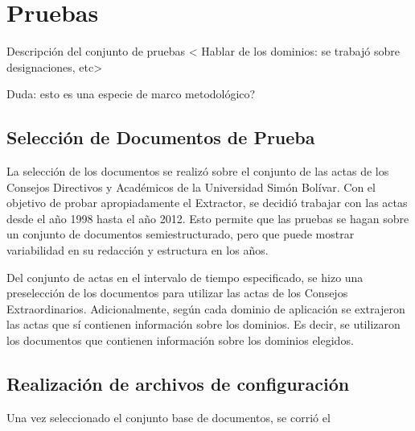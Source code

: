\chapter{Pruebas} \label{chap:pruebas}

Descripción del conjunto de pruebas < Hablar de los dominios: se trabajó sobre designaciones, etc>

Duda: esto es una especie de marco metodológico?

\section{Selección de Documentos de Prueba}

La selección de los documentos se realizó sobre el conjunto de las actas de los Consejos Directivos y Académicos de la Universidad Simón Bolívar. Con el objetivo de probar apropiadamente el Extractor, se decidió trabajar con las actas desde el año 1998 hasta el año 2012. Esto permite que las pruebas se hagan sobre un conjunto de documentos semiestructurado, pero que puede mostrar variabilidad en su redacción y estructura en los años.

Del conjunto de actas en el intervalo de tiempo especificado, se hizo una preselección de los documentos para utilizar las actas de los Consejos Extraordinarios. Adicionalmente, según cada dominio de aplicación se extrajeron las actas que sí contienen información sobre los dominios. Es decir, se utilizaron los documentos que contienen información sobre los dominios elegidos.

\section{Realización de archivos de configuración}

Una vez seleccionado el conjunto base de documentos, se corrió el 